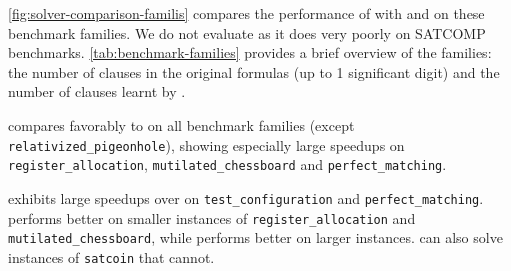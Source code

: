 \autoref{fig:solver-comparison-familis} compares the performance of \tool with
\cadical and \prelearn on these benchmark families. We do not evaluate \sadical as
it does very poorly on SATCOMP benchmarks. \autoref{tab:benchmark-families} 
provides a brief overview of the families: the number of clauses in the original formulas 
(up to 1 significant digit) and the number of \pr clauses learnt by \tool.

\tool compares favorably to \cadical on all benchmark families (except
\texttt{relativized\_pigeonhole}), showing especially large speedups on
\texttt{register\_allocation}, \texttt{mutilated\_chessboard} and
\texttt{perfect\_matching}. 

\prelearn exhibits large speedups
over \tool on \texttt{test\_configuration} and \texttt{perfect\_matching}. \tool
performs better on smaller instances of \texttt{register\_allocation} and
\texttt{mutilated\_chessboard}, while \prelearn performs better on larger
instances. \tool can also solve instances of \texttt{satcoin} that \prelearn
cannot.




